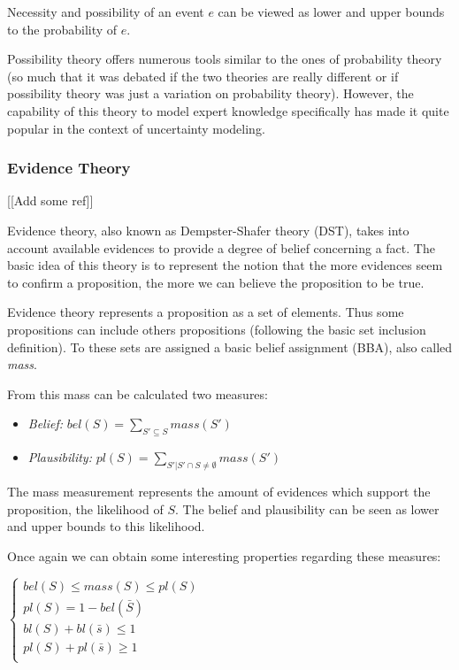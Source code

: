 Necessity and possibility of an event $e$ can be viewed as lower and upper bounds to the probability of $e$.

Possibility theory offers numerous tools similar to the ones of probability theory (so much that it was debated if the two theories are really different or if possibility theory was just a variation on probability theory). However, the capability of this theory to model expert knowledge specifically has made it quite popular in the context of uncertainty modeling.

\subsubsection{Evidence Theory}

[[Add some ref]]

Evidence theory, also known as Dempster-Shafer theory (DST), takes into account available evidences to provide a degree of belief concerning a fact.
The basic idea of this theory is to represent the notion that the more evidences seem to confirm a proposition, the more we can believe the proposition to be true.

Evidence theory represents a proposition as a set of elements. Thus some propositions can include others propositions (following the basic set inclusion definition). To these sets are assigned a basic belief assignment (BBA), also called \emph{mass}.

From this mass can be calculated two measures:

\begin{itemize}
\item \emph{Belief:} $bel(S) = \sum_{S'\subseteq{S}} mass(S')$
\item \emph{Plausibility:} $pl(S) = \sum_{S'|S' \cap S \neq \emptyset} mass(S')$
\end{itemize}

The mass measurement represents the amount of evidences which support the proposition, the likelihood of $S$. The belief and plausibility can be seen as lower and upper bounds to this likelihood.

Once again we can obtain some interesting properties regarding these measures:

$\left\{
\begin{array}{l}
bel(S) \leq mass(S) \leq pl(S)\\
pl(S) = 1 - bel(\bar{S})\\
bl(S) + bl(\bar{s}) \leq 1\\
pl(S) + pl(\bar{s}) \geq 1\\
\end{array}
\right.$

